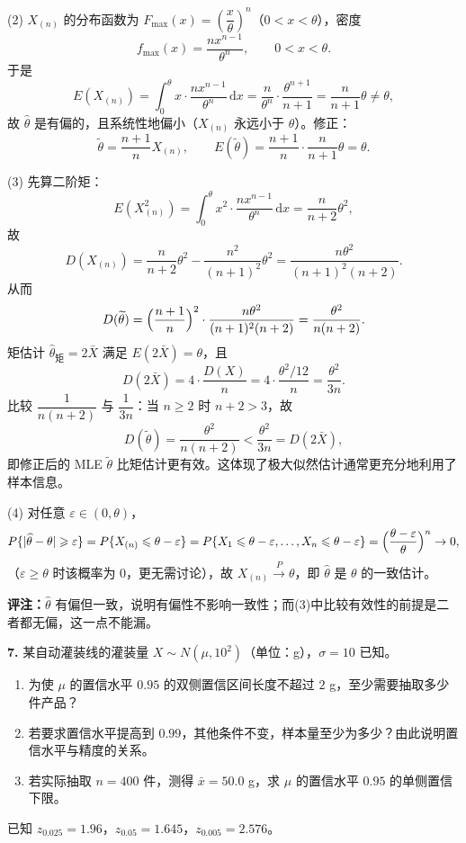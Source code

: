 (2) $X_{(n)}$ 的分布函数为 $F_{\max}(x)=\left(\dfrac{x}{\theta}\right)^{n}$（$0<x<\theta$），密度
\[
f_{\max}(x)=\frac{nx^{n-1}}{\theta^{n}},\qquad 0<x<\theta .
\]
于是
\[
E(X_{(n)})=\int_{0}^{\theta}x\cdot\frac{nx^{n-1}}{\theta^{n}}\,\mathrm{d}x
=\frac{n}{\theta^{n}}\cdot\frac{\theta^{n+1}}{n+1}
=\frac{n}{n+1}\theta\neq\theta ,
\]
故 $\widehat\theta$ 是有偏的，且系统性地偏小（$X_{(n)}$ 永远小于 $\theta$）。修正：
\[
\widetilde\theta=\frac{n+1}{n}X_{(n)},\qquad
E(\widetilde\theta)=\frac{n+1}{n}\cdot\frac{n}{n+1}\theta=\theta .
\]

(3) 先算二阶矩：
\[
E(X_{(n)}^{2})=\int_{0}^{\theta}x^{2}\cdot\frac{nx^{n-1}}{\theta^{n}}\,\mathrm{d}x
=\frac{n}{n+2}\theta^{2},
\]
故
\[
D(X_{(n)})=\frac{n}{n+2}\theta^{2}-\frac{n^{2}}{(n+1)^{2}}\theta^{2}
=\frac{n\theta^{2}}{(n+1)^{2}(n+2)} .
\]
从而
\[
D(\widetilde\theta)=\Bigl(\frac{n+1}{n}\Bigr)^{2}\cdot\frac{n\theta^{2}}{(n+1)^{2}(n+2)}
=\frac{\theta^{2}}{n(n+2)} .
\]
矩估计 $\widehat\theta_{\text{矩}}=2\bar X$ 满足 $E(2\bar X)=\theta$，且
\[
D(2\bar X)=4\cdot\frac{D(X)}{n}=4\cdot\frac{\theta^{2}/12}{n}=\frac{\theta^{2}}{3n}.
\]
比较 $\dfrac{1}{n(n+2)}$ 与 $\dfrac{1}{3n}$：当 $n\geqslant2$ 时 $n+2>3$，故
\[
D(\widetilde\theta)=\frac{\theta^{2}}{n(n+2)}<\frac{\theta^{2}}{3n}=D(2\bar X),
\]
即修正后的 MLE $\widetilde\theta$ 比矩估计更有效。这体现了极大似然估计通常更充分地利用了样本信息。

(4) 对任意 $\varepsilon\in(0,\theta)$，
\[
P\{|\widehat\theta-\theta|\geqslant\varepsilon\}
=P\{X_{(n)}\leqslant\theta-\varepsilon\}
=P\{X_1\leqslant\theta-\varepsilon,\ldots,X_n\leqslant\theta-\varepsilon\}
=\Bigl(\frac{\theta-\varepsilon}{\theta}\Bigr)^{n}\to0 ,
\]
（$\varepsilon\geqslant\theta$ 时该概率为 $0$，更无需讨论），故 $X_{(n)}\xrightarrow{P}\theta$，即 $\widehat\theta$ 是 $\theta$ 的一致估计。

\textbf{评注：}$\widehat\theta$ 有偏但一致，说明有偏性不影响一致性；而(3)中比较有效性的前提是二者都无偏，这一点不能漏。


\else \answerarea[10] \fi%
\textbf{7.} 某自动灌装线的灌装量 $X\sim N(\mu,10^{2})$（单位：g），$\sigma=10$ 已知。
\begin{enumerate}[label=(\arabic*)]
    \item 为使 $\mu$ 的置信水平 $0.95$ 的双侧置信区间长度不超过 $2$ g，至少需要抽取多少件产品？
    \item 若要求置信水平提高到 $0.99$，其他条件不变，样本量至少为多少？由此说明置信水平与精度的关系。
    \item 若实际抽取 $n=400$ 件，测得 $\bar x=50.0$ g，求 $\mu$ 的置信水平 $0.95$ 的单侧置信下限。
\end{enumerate}
已知 $z_{0.025}=1.96$，$z_{0.05}=1.645$，$z_{0.005}=2.576$。

